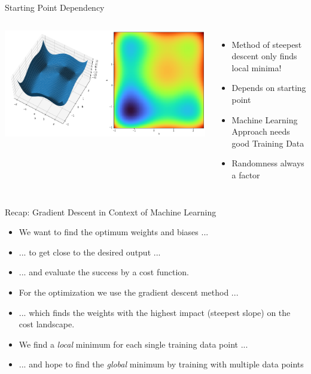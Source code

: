 
\begin{frame}{Starting Point Dependency}
%
\begin{columns}[T]
	\includegraphics[width=\linewidth]{./gfx/localMins}
%
	\begin{itemize}
	\item Method of steepest descent only finds local minima!
	\item Depends on starting point
	\item[\Thus] Machine Learning Approach needs good Training Data
	\item[\Thus] Randomness always a factor
	\end{itemize}
\end{columns}
%
\end{frame}


\begin{frame}{Recap: Gradient Descent in Context of Machine Learning}
%
\begin{itemize}
\item We want to find the optimum weights and biases ...
\item ... to get close to the desired output ...
\item ... and evaluate the success by a cost function.
\item For the optimization we use the gradient descent method ...
\item ... which finds the weights with the highest impact (steepest slope) on the cost landscape.
\item We find a \emph{local} minimum for each single training data point ...
\item ... and hope to find the \emph{global} minimum by training with multiple data points
\end{itemize}
%
\end{frame}

